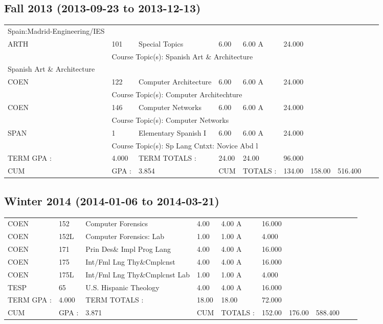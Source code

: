 \documentclass{scrartcl}\usepackage[T1]{fontenc}
\begin{document}
\subsection{Fall 2013	(2013-09-23 to 2013-12-13)}
\begin{tabular}{ l  l  l  l  l  l  l  l  l  l }
Spain:Madrid-Engineering/IES& & & & & & & & & \\
ARTH&101&Special Topics&6.00&6.00 A&24.000& & & & \\
\multicolumn{1}{l}{ }
&
\multicolumn{9}{l}{Course Topic(s): Spanish Art \& Architecture}
\\
Spanish Art \& Architecture& & & & & & & & & \\
COEN&122&Computer Architecture&6.00&6.00 A&24.000& & & & \\
\multicolumn{1}{l}{ }
&
\multicolumn{9}{l}{Course Topic(s): Computer Architechture}
\\
COEN&146&Computer Networks&6.00&6.00 A&24.000& & & & \\
\multicolumn{1}{l}{ }
&
\multicolumn{9}{l}{Course Topic(s): Computer Networks}
\\
SPAN&1&Elementary Spanish I&6.00&6.00 A&24.000& & & & \\
\multicolumn{1}{l}{ }
&
\multicolumn{9}{l}{Course Topic(s): Sp Lang Cntxt: Novice Abd l}
\\
\hline
TERM GPA :&4.000&TERM TOTALS :&24.00&24.00&96.000& & & & \\
CUM&GPA :&3.854&CUM&TOTALS :&134.00&158.00&516.400& & \\\end{tabular}
\subsection{Winter 2014	(2014-01-06 to 2014-03-21)}
\begin{tabular}{ l  l  l  l  l  l  l  l  l  l }
COEN&152&Computer Forensics&4.00&4.00 A&16.000& & & & \\
COEN&152L&Computer Forensics: Lab&1.00&1.00 A&4.000& & & & \\
COEN&171&Prin Des\& Impl Prog Lang&4.00&4.00 A&16.000& & & & \\
COEN&175&Int/Fml Lng Thy\&Cmplcnst&4.00&4.00 A&16.000& & & & \\
COEN&175L&Int/Fml Lng Thy\&Cmplcnst Lab&1.00&1.00 A&4.000& & & & \\
TESP&65&U.S. Hispanic Theology&4.00&4.00 A&16.000& & & & \\
\hline
TERM GPA :&4.000&TERM TOTALS :&18.00&18.00&72.000& & & & \\
CUM&GPA :&3.871&CUM&TOTALS :&152.00&176.00&588.400& & \\\end{tabular}
\end{document}
